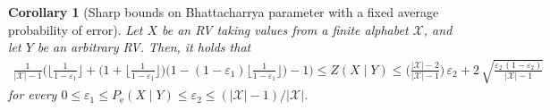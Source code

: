 \documentclass[conference, draftcls, onecolumn]{IEEEtran}
\theoremstyle{plain}
\newtheorem{corollary}{Corollary}
\begin{document}
\begin{corollary}[Sharp bounds on Bhattacharrya parameter with a fixed average probability of error]
\label{cor:bhattacharrya_Pe}
Let $X$ be an RV taking values from a finite alphabet $\mathcal{X}$, and let $Y$ be an arbitrary RV.
Then, it holds that
\begin{align}
\frac{ 1 }{ |\mathcal{X}| - 1 } \Bigg( \Big\lfloor \frac{ 1 }{ 1 - \varepsilon_{1} } \Big\rfloor + \Big( 1 + \Big\lfloor \frac{ 1 }{ 1 - \varepsilon_{1} } \Big\rfloor \Big) \bigg( 1 - (1-\varepsilon_{1}) \Big\lfloor \frac{ 1 }{ 1 - \varepsilon_{1} } \Big\rfloor \bigg) - 1 \Bigg)
\le
Z(X \mid Y)
\le
\bigg( \frac{ |\mathcal{X}| - 2 }{ |\mathcal{X}| - 1 } \bigg) \, \varepsilon_{2} + 2 \, \sqrt{ \frac{ \varepsilon_{2} \, (1-\varepsilon_{2}) }{ |\mathcal{X}| - 1 } }
\label{bound:Z_Pe}
\end{align}
for every $0 \le \varepsilon_{1} \le P_{\mathrm{e}}(X \mid Y) \le \varepsilon_{2} \le (|\mathcal{X}| - 1) / |\mathcal{X}|$.
\end{corollary}
\end{document}
